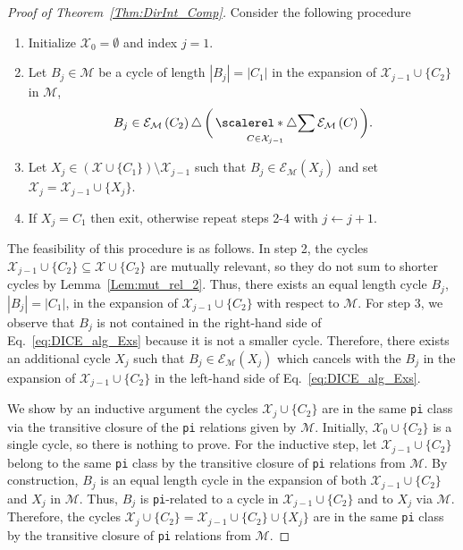 \documentclass[fleqn,11pt]{article}
\newcommand\calM{\mathcal{M}}
\newcommand\calX{\mathcal{X}}     %
\newcommand\expand[2]{\mathcal{E}_{#1}\left(#2\right)}   %
\newcommand\symdiff{\mathop{\triangle}}
\DeclareMathOperator*{\symdiffseries}{\scalerel*{\triangle}{\sum}}
\begin{document}
\begin{proof}[Proof of Theorem~\ref{Thm:DirInt_Comp}]
	Consider the following procedure
	\begin{enumerate}
		\item Initialize $\calX_0=\emptyset$ and index $j=1$.
		\item Let $B_j\in\calM$ be a cycle of length $|B_j|{=}|C_1|$ in the expansion of $\calX_{j-1}\cup\{C_2\}$ in $\calM$,
		\begin{equation*}
			B_j\in
			\expand{\calM}{C_2}\symdiff\bigg(\symdiffseries_{{C\in\calX_{j-1}}}\expand{\calM}{C}\bigg).
		\end{equation*}
		\item Let $X_j\in (\calX\cup\{C_1\})\setminus\calX_{j-1}$ such that $B_j\in\expand{\calM}{X_j}$ and set $\calX_j = \calX_{j-1}\cup\{X_j\}$.
		\item If $X_j=C_1$ then exit, otherwise repeat steps 2-4 with $j\gets j+1$.
	\end{enumerate}
	The feasibility of this procedure is as follows.
	In step 2, the cycles $\calX_{j-1}\cup\{C_2\}\subseteq\calX\cup\{C_2\}$ are mutually relevant, so they do not sum to shorter cycles by Lemma~\ref{Lem:mut_rel_2}. Thus, there exists an equal length cycle $B_j$, $|B_j|=|C_1|$, in the expansion of $\calX_{j-1}\cup\{C_2\}$ with respect to $\calM$.
	For step 3, we observe that $B_j$ is not contained in the right-hand side of Eq.~\eqref{eq:DICE_alg_Exs} because it is not a smaller cycle. 
	Therefore, there exists an additional cycle $X_j$ such that $B_j\in\expand{\calM}{X_j}$ which cancels with the $B_j$ in the expansion of $\calX_{j-1}\cup\{C_2\}$ in the left-hand side of Eq.~\eqref{eq:DICE_alg_Exs}. 
	
	We show by an inductive argument the cycles $\calX_j\cup\{C_2\}$ are in the same {\tt pi} class via the transitive closure of the {\tt pi} relations given by $\calM$.
	Initially, $\calX_0\cup\{C_2\}$ is a single cycle, so there is nothing to prove.
	For the inductive step, let $\calX_{j-1}\cup\{C_2\}$ belong to the same {\tt pi} class by %
	the transitive closure of {\tt pi} relations from $\calM$. By construction, $B_j$ is an equal length cycle in the expansion of both $\calX_{j-1}\cup\{C_2\}$ and $X_j$ in $\calM$. Thus, $B_j$ is {\tt pi}-related to a cycle in $\calX_{j-1}\cup\{C_2\}$ and to $X_j$ via $\calM$. Therefore, the cycles $\calX_j\cup\{C_2\}=\calX_{j-1}\cup\{C_2\}\cup\{X_j\}$ are in the same {\tt pi} class by %
	the transitive closure of {\tt pi} relations from $\calM$. 
	

\end{proof}
\end{document}
